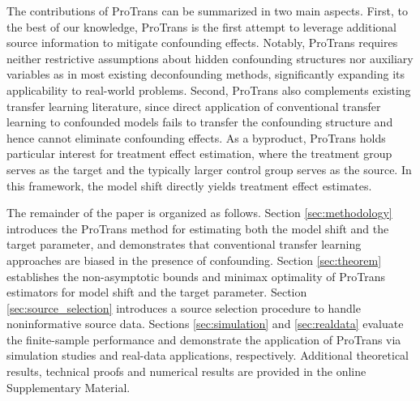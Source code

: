 \documentclass[12pt]{article}
\begin{document}

The contributions of ProTrans can be summarized in two main aspects. First, to the best of our knowledge, ProTrans is the first attempt to leverage additional source information to mitigate confounding effects. %
Notably, ProTrans requires neither restrictive assumptions about hidden confounding structures nor auxiliary variables as in most existing deconfounding methods, significantly expanding its applicability to real-world problems. Second, ProTrans also complements existing transfer learning literature, since direct application of conventional transfer learning to confounded models fails to transfer the confounding structure and hence cannot eliminate confounding effects. As a byproduct, ProTrans holds particular interest for treatment effect estimation, where the treatment group serves as the target and the typically larger control group serves as the source. In this framework, the model shift directly yields treatment effect estimates.


The remainder of the paper is organized as follows. Section \ref{sec:methodology} introduces the ProTrans method for estimating both the model shift and the target parameter, and demonstrates that conventional transfer learning approaches are biased in the presence of confounding. Section \ref{sec:theorem} establishes the non-asymptotic bounds and minimax optimality of ProTrans estimators for model shift and the target parameter. Section \ref{sec:source_selection} introduces a source selection procedure to handle noninformative source data. Sections \ref{sec:simulation} and \ref{sec:realdata} evaluate the finite-sample performance and demonstrate the application of ProTrans via simulation studies and real-data applications, respectively. Additional theoretical results, technical proofs and numerical results are provided in the online Supplementary Material.
\end{document}
